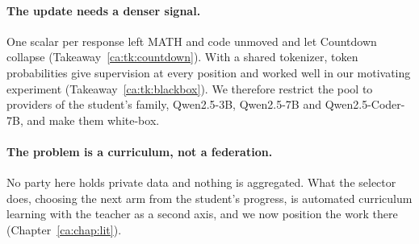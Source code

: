 \paragraph{The update needs a denser signal.} One scalar per response left MATH and code
unmoved and let Countdown collapse (Takeaway~\ref{ca:tk:countdown}). With a shared
tokenizer, token probabilities give supervision at every position and worked well in our
motivating experiment (Takeaway~\ref{ca:tk:blackbox}). We therefore restrict the pool to
providers of the student's family, Qwen2.5-3B, Qwen2.5-7B and Qwen2.5-Coder-7B, and make
them white-box.

\paragraph{The problem is a curriculum, not a federation.} No party here holds private
data and nothing is aggregated. What the selector does, choosing the next arm from the
student's progress, is automated curriculum learning with the teacher as a second axis,
and we now position the work there (Chapter~\ref{ca:chap:lit}).
